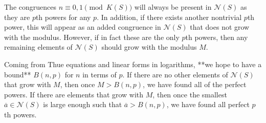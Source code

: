 \documentclass[12pt]{amsart}
\newtheorem{thm}{Theorem}[section]
\theoremstyle{definition}
\def\N{{\mathcal N}}
\renewcommand{\bar}{\overline}
\begin{document}
The congruences $n \equiv 0,1 \pmod{K(S)}$ will always be present in $\N(S)$ as they are $p$th powers for any $p$.  In addition, if there exists another nontrivial $p$th power, this will appear as an added congruence in $\N(S)$ that does not grow with the modulus.  However, if in fact these are the only $p$th powers, then any remaining elements of $\N(S)$ should grow with the modulus $M$.  

Coming from Thue equations and linear forms in logarithms, **we hope to have a bound**  $B(n,p)$ for $n$ in terms of $p$.  If there are no other elements of $\N(S)$ that grow with $M$, then once $M >B(n,p)$, we have found all of the perfect powers.  If there are elements that grow with $M$, then once the smallest $\bar{a} \in \N(S)$ is large enough such that $\bar{a} > B(n,p)$, we have found all perfect $p$th powers.
















{}

\end{document}
